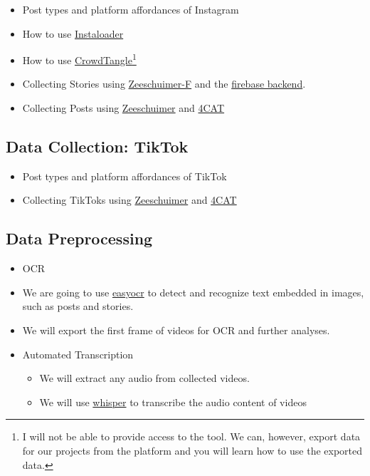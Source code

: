 \documentclass[
  letterpaper,
  DIV=11,
  numbers=noendperiod]{scrartcl}
\providecommand{\tightlist}{%
  \setlength{\itemsep}{0pt}\setlength{\parskip}{0pt}}\usepackage{longtable,booktabs,array}
\begin{document}
\begin{itemize}
\tightlist
\item
  Post types and platform affordances of Instagram
\item
  How to use \href{https://instaloader.github.io/}{Instaloader}
\item
  How to use \href{https://www.crowdtangle.com/}{CrowdTangle}\footnote{I
    will not be able to provide access to the tool. We can, however,
    export data for our projects from the platform and you will learn
    how to use the exported data.}
\item
  Collecting Stories using
  \href{https://github.com/michaelachmann/zeeschuimer-f}{Zeeschuimer-F}
  and the
  \href{https://github.com/michaelachmann/zeeschuimer-firebase-backend}{firebase
  backend}.
\item
  Collecting Posts using
  \href{https://github.com/digitalmethodsinitiative/zeeschuimer}{Zeeschuimer}
  and \href{https://4cat.digitalhumanities.io/}{4CAT}
\end{itemize}

\hypertarget{data-collection-tiktok}{%
\subsection{Data Collection: TikTok}\label{data-collection-tiktok}}

\begin{itemize}
\tightlist
\item
  Post types and platform affordances of TikTok
\item
  Collecting TikToks using
  \href{https://github.com/digitalmethodsinitiative/zeeschuimer}{Zeeschuimer}
  and \href{https://4cat.digitalhumanities.io/}{4CAT}
\end{itemize}

\hypertarget{data-preprocessing}{%
\subsection{Data Preprocessing}\label{data-preprocessing}}

\begin{itemize}
\tightlist
\item
  OCR
\item
  We are going to use
  \href{https://github.com/JaidedAI/EasyOCR}{easyocr} to detect and
  recognize text embedded in images, such as posts and stories.
\item
  We will export the first frame of videos for OCR and further analyses.
\item
  Automated Transcription

  \begin{itemize}
  \tightlist
  \item
    We will extract any audio from collected videos.
  \item
    We will use
    \href{https://huggingface.co/openai/whisper-large-v2}{whisper} to
    transcribe the audio content of videos
  \end{itemize}
\end{itemize}
\end{document}

